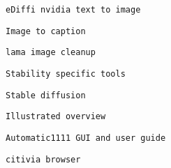          
         
          \protect\hypertarget{ID_122994262}{}{}

\begin{verbatim}
eDiffi nvidia text to image
\end{verbatim}
         

         
         
          \protect\hypertarget{ID_419748284}{}{}

\begin{verbatim}
Image to caption
\end{verbatim}
         

         
         
          \protect\hypertarget{ID_654983322}{}{}

\begin{verbatim}
lama image cleanup
\end{verbatim}
         

         
         
          \protect\hypertarget{ID_473586994}{}{}

\begin{verbatim}
Stability specific tools
\end{verbatim}

           
           
            \protect\hypertarget{ID_1077630529}{}{}

\begin{verbatim}
Stable diffusion
\end{verbatim}

             
             
              \protect\hypertarget{ID_1588862598}{}{}

\begin{verbatim}
Illustrated overview
\end{verbatim}
             

             
             
              \protect\hypertarget{ID_529410033}{}{}

\begin{verbatim}
Automatic1111 GUI and user guide
\end{verbatim}

               
               
                \protect\hypertarget{ID_700088774}{}{}

\begin{verbatim}
citivia browser
\end{verbatim}
               
